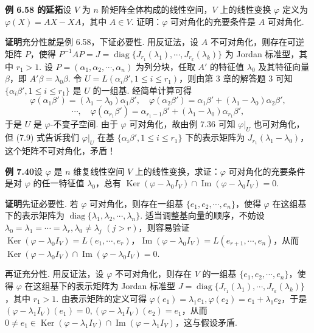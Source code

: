 \documentclass[UTF8,12pt,a4paper,fontset=fandol]{ctexart}
\begin{document}
\noindent\textbf{例 6.58 的延拓}\quad 设 $V$ 为 $n$ 阶矩阵全体构成的线性空间，$V$ 上的线性变换 $\varphi$ 定义为 $\varphi(X)=AX-XA$，其中 $A\in V$. 证明：$\varphi$ 可对角化的充要条件是 $A$ 可对角化.

\noindent\textbf{证明}\quad 充分性就是例 6.58，下证必要性. 用反证法，设 $A$ 不可对角化，则存在可逆矩阵 $P$，使得 $P^{-1}AP=J=\operatorname{diag}\{J_{r_1}(\lambda_1),\cdots,J_{r_k}(\lambda_k)\}$ 为 Jordan 标准型，其中 $r_1>1$. 设 $P=(\alpha_1,\alpha_2,\cdots,\alpha_n)$ 为列分块，任取 $A'$ 的特征值 $\lambda_0$ 及其特征向量 $\beta$，即 $A'\beta=\lambda_0\beta$. 令 $U=L(\alpha_i\beta',1\le i\le r_1)$，则由第 3 章的解答题 3 可知 $\{\alpha_i\beta',1\le i\le r_1\}$ 是 $U$ 的一组基. 经简单计算可得
\begin{equation}
\varphi(\alpha_1\beta')=(\lambda_1-\lambda_0)\alpha_1\beta',\quad
\varphi(\alpha_2\beta')=\alpha_1\beta'+(\lambda_1-\lambda_0)\alpha_2\beta',
\end{equation}
\[
\cdots,\quad
\varphi(\alpha_{r_1}\beta')=\alpha_{r_1-1}\beta'+(\lambda_1-\lambda_0)\alpha_{r_1}\beta',
\tag{7.9}
\]
于是 $U$ 是 $\varphi$-不变子空间. 由于 $\varphi$ 可对角化，故由例 7.36 可知 $\varphi|_U$ 也可对角化，但 (7.9) 式告诉我们 $\varphi|_U$ 在基 $\{\alpha_i\beta',1\le i\le r_1\}$ 下的表示矩阵为 $J_{r_1}(\lambda_1-\lambda_0)$，这个矩阵不可对角化，矛盾！

\noindent\textbf{例 7.40}\quad 设 $\varphi$ 是 $n$ 维复线性空间 $V$ 上的线性变换，求证：$\varphi$ 可对角化的充要条件是对 $\varphi$ 的任一特征值 $\lambda_0$，总有 $\operatorname{Ker}(\varphi-\lambda_0I_V)\cap\operatorname{Im}(\varphi-\lambda_0I_V)=0$.

\noindent\textbf{证明}\quad 先证必要性. 若 $\varphi$ 可对角化，则存在一组基 $\{e_1,e_2,\cdots,e_n\}$，使得 $\varphi$ 在这组基下的表示矩阵为 $\operatorname{diag}\{\lambda_1,\lambda_2,\cdots,\lambda_n\}$. 适当调整基向量的顺序，不妨设 $\lambda_0=\lambda_1=\cdots=\lambda_r,\lambda_0\ne\lambda_j$ $(j>r)$，则容易验证 $\operatorname{Ker}(\varphi-\lambda_0I_V)=L(e_1,\cdots,e_r)$，$\operatorname{Im}(\varphi-\lambda_0I_V)=L(e_{r+1},\cdots,e_n)$，从而 $\operatorname{Ker}(\varphi-\lambda_0I_V)\cap\operatorname{Im}(\varphi-\lambda_0I_V)=0$.

再证充分性. 用反证法，设 $\varphi$ 不可对角化，则存在 $V$ 的一组基 $\{e_1,e_2,\cdots,e_n\}$，使得 $\varphi$ 在这组基下的表示矩阵为 Jordan 标准型 $J=\operatorname{diag}\{J_{r_1}(\lambda_1),\cdots,J_{r_k}(\lambda_k)\}$，其中 $r_1>1$. 由表示矩阵的定义可得 $\varphi(e_1)=\lambda_1e_1,\varphi(e_2)=e_1+\lambda_1e_2$，于是 $(\varphi-\lambda_1I_V)(e_1)=0,(\varphi-\lambda_1I_V)(e_2)=e_1$，从而 $0\ne e_1\in\operatorname{Ker}(\varphi-\lambda_1I_V)\cap\operatorname{Im}(\varphi-\lambda_1I_V)$，这与假设矛盾.
\end{document}
